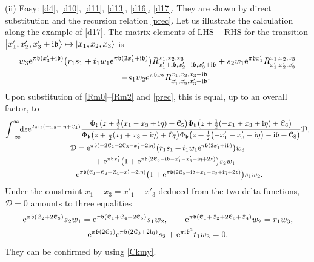 \documentclass[pdftex]{sigma}
\newcommand{\bb}{{\mathfrak b}}
\newcommand{\e}{{\mathrm e}}
\numberwithin{equation}{section}
\begin{document}
 (ii) Easy: \eqref{d4}, \eqref{d10}, \eqref{d11}, \eqref{d13},
 \eqref{d16}, \eqref{d17}. They are shown by direct substitution and
 the recursion relation \eqref{prec}. Let us illustrate the
 calculation along the example of \eqref{d17}. The matrix elements
 of $\mathrm{LHS} - \mathrm{RHS}$ for the transition
 $\bigl|x'_1,x'_2,x'_3+{\rm i}\bb\bigr\rangle \mapsto |x_1,x_2,x_3\rangle$ is
\begin{gather*}
w_3\e^{\pi \bb (x'_3+{\rm i}\bb)}\bigl(r_1s_1+t_1w_1\e^{\pi \bb(2x'_1+{\rm i}\bb)}\bigr)
R^{x_1,x_2,x_3}_{x'_1+{\rm i}\bb,x'_2-{\rm i}\bb,x'_3+{\rm i}\bb}
+s_2w_1\e^{\pi\bb x'_1}R^{x_1,x_2,x_3}_{x'_1,x'_2, x'_3}\\
\qquad
-s_1w_2\e^{\pi \bb x_2}
R^{x_1,x_2,x_3+{\rm i}\bb}_{x'_1,x'_2,x'_3+{\rm i}\bb}.
\end{gather*}
Upon substitution of \eqref{Rm0}--\eqref{Rm2} and \eqref{prec}, this
is equal, up to an overall factor, to
\begin{gather*}
\int_{-\infty}^\infty\!\! {\rm d}z \e^{2\pi {\rm i} z(-x_2-{\rm i}\eta+{\mathcal C}_4)}
\frac{\Phi_\bb\bigl(z+\frac{1}{2}(x_1-x_3+{\rm i}\eta)+{\mathcal C}_5\bigr)
\Phi_\bb\bigl(z+\frac{1}{2}(-x_1+x_3+{\rm i}\eta)+{\mathcal C}_6\bigr)}
{\Phi_\bb\bigl(z+\frac{1}{2}(x_1+x_3-{\rm i}\eta)+{\mathcal C}_7\bigr)
\Phi_\bb\bigl(z+\frac{1}{2}\bigl(-x'_1-x'_3-{\rm i}\eta\bigr)-{\rm i} \bb+{\mathcal C}_8\bigr)}\mathcal{D},
\\
\mathcal{D} = \e^{\pi \bb(-2{\mathcal C}_2-2{\mathcal C}_3-x'_1-2{\rm i}\eta)}\bigl(r_1s_1+t_1w_1\e^{\pi \bb(2x'_1+{\rm i}\bb)}\bigr)w_3\\
\phantom{\mathcal{D} =}{}
+\e^{\pi \bb x'_1}\bigl(1+\e^{\pi \bb(2{\mathcal C}_8-{\rm i}\bb -x'_1-x'_3-{\rm i}\eta+2z)}\bigr)s_2w_1
\\
\phantom{\mathcal{D} =}{} -\e^{\pi \bb({\mathcal C}_1-{\mathcal C}_2+{\mathcal C}_4-x'_1-2{\rm i}\eta)}
\bigl(1+\e^{\pi \bb(2{\mathcal C}_5-{\rm i}\bb+x_1-x_3+{\rm i}\eta+2z)}\bigr)s_1w_2.
\end{gather*}
Under the constraint $x_1-x_3=x'_1-x'_3$ deduced from the two delta
functions, $\mathcal{D}=0$ amounts to three equalities
\begin{gather*}
\e^{\pi \bb({\mathcal C}_2+2{\mathcal C}_8)}s_2w_1 = \e^{\pi \bb
 ({\mathcal C}_1+{\mathcal C}_4+2{\mathcal C}_5)}s_1w_2 ,\qquad
\e^{\pi \bb({\mathcal C}_1+{\mathcal C}_2+2{\mathcal C}_3+{\mathcal
 C}_4)}w_2=r_1w_3,\\
\e^{\pi \bb(2{\mathcal C}_2)} \e^{\pi\bb(2{\mathcal C}_3+2{\rm i}\eta)}s_2+\e^{\pi {\rm i}
 \bb^2}t_1w_3=0.
\end{gather*}
 They can be confirmed by using \eqref{Ckmy}.
\end{document}
